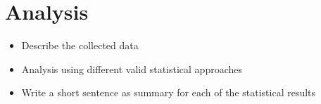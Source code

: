 \section{Analysis}

\begin{itemize}
\item Describe the collected data
\item Analysis using different valid statistical approaches
\item Write a short sentence as summary for each of the statistical results
\end{itemize}